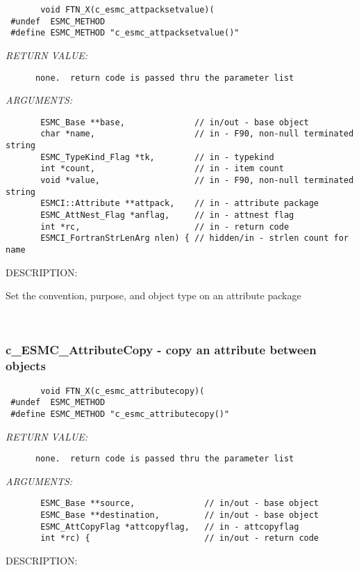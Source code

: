   
\begin{verbatim}       void FTN_X(c_esmc_attpacksetvalue)(
 #undef  ESMC_METHOD
 #define ESMC_METHOD "c_esmc_attpacksetvalue()"\end{verbatim}{\em RETURN VALUE:}
\begin{verbatim}      none.  return code is passed thru the parameter list
   \end{verbatim}{\em ARGUMENTS:}
\begin{verbatim}       ESMC_Base **base,              // in/out - base object
       char *name,                    // in - F90, non-null terminated string
       ESMC_TypeKind_Flag *tk,        // in - typekind
       int *count,                    // in - item count
       void *value,                   // in - F90, non-null terminated string
       ESMCI::Attribute **attpack,    // in - attribute package
       ESMC_AttNest_Flag *anflag,     // in - attnest flag
       int *rc,                       // in - return code
       ESMCI_FortranStrLenArg nlen) { // hidden/in - strlen count for name
   \end{verbatim}
{\sf DESCRIPTION:\\ }


       Set the convention, purpose, and object type on an attribute package
   
 
\mbox{}\hrulefill\ 
 
\subsubsection [c\_ESMC\_AttributeCopy] {c\_ESMC\_AttributeCopy - copy an attribute between objects}


  
\begin{verbatim}       void FTN_X(c_esmc_attributecopy)(
 #undef  ESMC_METHOD
 #define ESMC_METHOD "c_esmc_attributecopy()"\end{verbatim}{\em RETURN VALUE:}
\begin{verbatim}      none.  return code is passed thru the parameter list
   \end{verbatim}{\em ARGUMENTS:}
\begin{verbatim}       ESMC_Base **source,              // in/out - base object
       ESMC_Base **destination,         // in/out - base object
       ESMC_AttCopyFlag *attcopyflag,   // in - attcopyflag
       int *rc) {                       // in/out - return code
   \end{verbatim}
{\sf DESCRIPTION:\\ }


